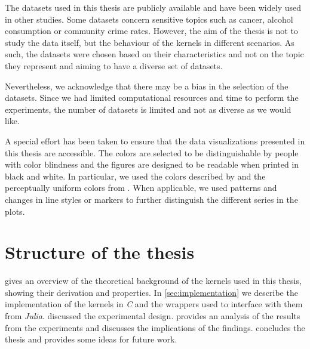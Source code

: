 The datasets used in this thesis are publicly available and have been widely
used in other studies. Some datasets concern sensitive topics such as cancer,
alcohol consumption or community crime rates. However, the aim of the thesis is
not to study the data itself, but the behaviour of the kernels in different
scenarios. As such, the datasets were chosen based on their characteristics and
not on the topic they represent and
aiming to have a diverse set of datasets.

Nevertheless, we acknowledge that there may be a bias in the selection of the
datasets. Since we had limited computational resources and time to perform the
experiments, the number of datasets is limited and not as diverse as we would
like.

A special effort has been taken to ensure that the data visualizations
presented in this thesis are accessible. The colors are selected to be
distinguishable by people with color blindness and the figures are designed to
be readable when printed in black and white. In particular,
we used the colors described by \textcite{wongPointsViewColor2011} and
the perceptually uniform colors from \textcite{crameriScientificColourMaps2023}.
When applicable, we used patterns and changes in line styles or markers to
further distinguish the different series in the plots.


\section{Structure of the thesis}

 gives an overview of the theoretical
background of the kernels used in this thesis, showing their derivation and
properties. In \cref{sec:implementation} we describe the implementation of the
kernels in \emph{C} and the wrappers used to interface with them from
\emph{Julia}.  discussed the experimental design.
 provides an analysis of the results from the experiments
and discusses the implications of the findings.
 concludes the thesis and provides some ideas for future
work.


